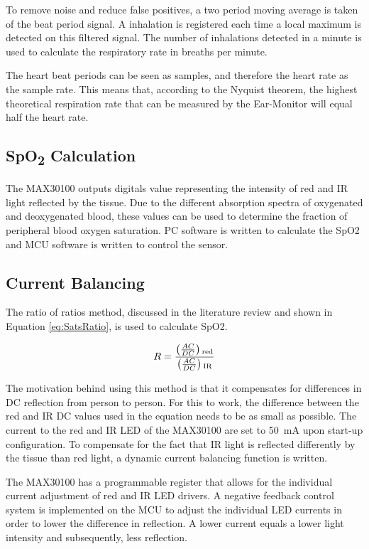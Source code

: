 To remove noise and reduce false positives, a two period moving average is taken of the beat period signal. A inhalation is registered each time a local maximum is detected on this filtered signal. The number of inhalations detected in a minute is used to calculate the respiratory rate in breaths per minute.

\medskip

The heart beat periods can be seen as samples, and therefore the heart rate as the sample rate. This means that, according to the Nyquist theorem, the highest theoretical respiration rate that can be measured by the Ear-Monitor will equal half the heart rate.

\subsection{SpO\textsubscript{2} Calculation}
The MAX30100 outputs digitals value representing the intensity of red and IR light reflected by the tissue. Due to the different absorption spectra of oxygenated and deoxygenated blood, these values can be used to determine the fraction of peripheral blood oxygen saturation. PC software is written to calculate the SpO2 and MCU software is written to control the sensor. 

\subsection{Current Balancing}
The ratio of ratios method, discussed in the literature review and shown in Equation \ref{eq:SatsRatio}, is used to calculate SpO2.

\begin{equation}
\label{eq:SatsRatio}
R = \frac{\left(\frac{AC}{DC}\right)\textsubscript{red}}{\left(\frac{AC}{DC}\right)\textsubscript{IR}}
\end{equation}

The motivation behind using this method is that it compensates for differences in DC reflection from person to person. For this to work, the difference between the red and IR DC values used in the equation needs to be as small as possible. The current to the red and IR LED of the MAX30100 are set to \SI{50}{\milli\ampere} upon start-up configuration. To compensate for the fact that IR light is reflected differently by the tissue than red light, a dynamic current balancing function is written.

\medskip

The MAX30100 has a programmable register that allows for the individual current adjustment of red and IR LED drivers. A negative feedback control system is implemented on the MCU to adjust the individual LED currents in order to lower the difference in reflection. A lower current equals a lower light intensity and subsequently, less reflection.

